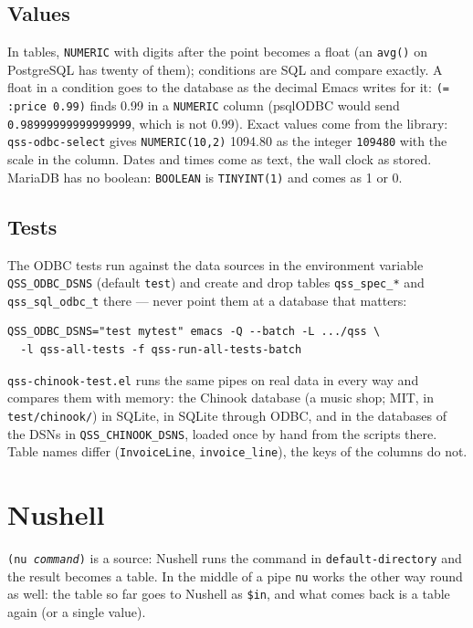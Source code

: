 \documentclass[
  paper=a4, fontsize=11pt, parskip=half, headings=small,
  toc=bibliography, numbers=noenddot, DIV=12
]{scrreprt}
\newcommand{\code}[1]{\texttt{#1}}
\newcommand{\file}[1]{\texttt{#1}}
\begin{document}
\section{Values}

In tables, \code{NUMERIC} with digits after the point becomes a float (an
\code{avg()} on PostgreSQL has twenty of them); conditions are SQL and compare
exactly. A float in a condition goes to the database as the decimal Emacs
writes for it: \code{(= :price 0.99)} finds 0.99 in a \code{NUMERIC} column
(psqlODBC would send \code{0.98999999999999999}, which is not 0.99). Exact
values come from the library: \code{qss-odbc-select} gives
\code{NUMERIC(10,2)} 1094.80 as the integer \code{109480} with the scale in
the column. Dates and times come as text, the wall clock as stored. MariaDB
has no boolean: \code{BOOLEAN} is \code{TINYINT(1)} and comes as 1 or 0.

\section{Tests}

The ODBC tests run against the data sources in the environment variable
\code{QSS\_ODBC\_DSNS} (default \code{test}) and create and drop tables
\code{qss\_spec\_*} and \code{qss\_sql\_odbc\_t} there --- never point them
at a database that matters:

\begin{Verbatim}
QSS_ODBC_DSNS="test mytest" emacs -Q --batch -L .../qss \
  -l qss-all-tests -f qss-run-all-tests-batch
\end{Verbatim}

\file{qss-chinook-test.el} runs the same pipes on real data in every way and
compares them with memory: the Chinook database (a music shop; MIT, in
\file{test/chinook/}) in SQLite, in SQLite through ODBC, and in the
databases of the DSNs in \code{QSS\_CHINOOK\_DSNS}, loaded once by hand from
the scripts there. Table names differ (\code{InvoiceLine},
\code{invoice\_line}), the keys of the columns do not.

\chapter{Nushell}\label{sec:nushell}

\code{(nu \emph{command})} is a source: Nushell runs the command in
\code{default-directory} and the result becomes a table. In the middle of a pipe
\code{nu} works the other way round as well: the table so far goes to Nushell as
\code{\$in}, and what comes back is a table again (or a single value).
\end{document}
